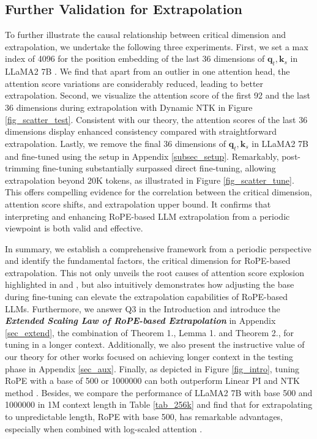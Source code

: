 \subsection{Further Validation for Extrapolation}\label{subsec_further}

To further illustrate the causal relationship between critical dimension and extrapolation, we undertake the following three experiments. First, we set a max index of 4096 for the position embedding of the last 36 dimensions of $\bm{q}_t,\bm{k}_s$ in LLaMA2 7B \citep{touvron2023llama2}. We find that apart from an outlier in one attention head, the attention score variations are considerably reduced, leading to better extrapolation. Second, we visualize the attention score of the first 92 and the last 36 dimensions during extrapolation with Dynamic NTK \citep{dynamicNTK} in Figure \ref{fig_scatter_test}. Consistent with our theory, the attention scores of the last 36 dimensions display enhanced consistency compared with straightforward extrapolation. Lastly, we remove the final 36 dimensions of $\bm{q}_t,\bm{k}_s$ in LLaMA2 7B \citep{touvron2023llama2} and fine-tuned using the setup in Appendix \ref{subsec_setup}. Remarkably, post-trimming fine-tuning substantially surpassed direct fine-tuning, allowing extrapolation beyond 20K tokens, as illustrated in Figure \ref{fig_scatter_tune}. This offers compelling evidence for the correlation between the critical dimension, attention score shifts, and extrapolation upper bound. It confirms that interpreting and enhancing RoPE-based LLM extrapolation from a periodic viewpoint is both valid and effective.

In summary, we establish a comprehensive framework from a periodic perspective and identify the fundamental factors, the critical dimension for RoPE-based extrapolation. This not only unveils the root causes of attention score explosion highlighted in \citet{chen2023extending} and \citet{han2023lm}, but also intuitively demonstrates how adjusting the base during fine-tuning can elevate the extrapolation capabilities of RoPE-based LLMs. Furthermore, we answer Q3 in the Introduction and introduce the \textbf{\textit{Extended Scaling Law of RoPE-based Extrapolation}} in Appendix \ref{sec_extend}, the combination of Theorem 1., Lemma 1. and Theorem 2., for tuning in a longer context. Additionally, we also present the instructive value of our theory for other works focused on achieving longer context in the testing phase in Appendix \ref{sec_aux}. Finally, as depicted in Figure \ref{fig_intro}, tuning RoPE with a base of 500 or 1000000 can both outperform Linear PI \citep{chen2023extending} and NTK method \citep{fixedNTK,dynamicNTK}. Besides, we compare the performance of LLaMA2 7B \cite{touvron2023llama2} with base 500 and 1000000 in 1M context length in Table \ref{tab_256k} and find that for extrapolating to unpredictable length, RoPE with base 500, has remarkable advantages, especially when combined with log-scaled attention \citep{log}. 

